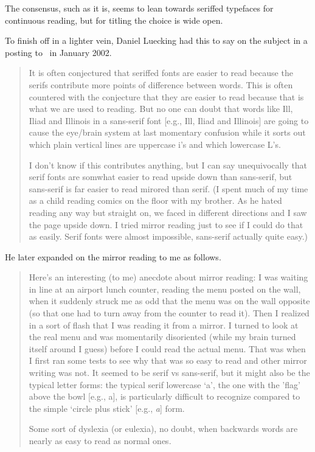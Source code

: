 \documentclass[10pt,letterpaper,extrafontsizes]{memoir}
\begin{document}
    The consensus, such as it is, seems to lean towards seriffed
typefaces for continuous reading, but for titling the choice is
wide open.


    To finish off in a lighter vein,  
    Daniel Luecking had this to say on the subject
in a posting to \pixctt\ in January 2002.
\begin{quotation}
    It is often conjectured that seriffed fonts are easier to read because
the serifs contribute more points of difference between words. This is
often countered with the conjecture that they are easier to read because 
that is what we are used to reading. But no one can doubt that words
like Ill, Iliad and Illinois in a sans-serif font 
[e.g., \textsf{Ill, Iliad and Illinois}] are going to cause the eye/brain 
system at last momentary confusion while it sorts out which plain vertical
lines are uppercase i's and which lowercase L's.

    I don't know if this contributes anything, but I can say unequivocally
that serif fonts are somwhat easier to read upside down than sans-serif,
but sans-serif is far easier to read mirored than serif. (I spent much
of my time as a child reading comics on the floor with my brother. As
he hated reading any way but straight on, we faced in different directions
and I saw the page upside down. I tried mirror reading just to see if
I could do that as easily. Serif fonts were almost impossible, sans-serif
actually quite easy.)

\end{quotation}

    He later expanded on the mirror reading to me as follows.
\begin{quotation}
Here's an interesting (to me) anecdote about mirror reading: I was waiting
in line at an airport lunch counter, reading the menu posted on the wall,
when it suddenly struck me as odd that the menu was on the wall opposite
(so that one had to turn away from the counter to read it). Then I
realized in a sort of flash that I was reading it from a mirror. I turned
to look at the real menu and was momentarily disoriented (while my brain
turned itself around I guess) before I could read the actual menu. That
was when I first ran some tests to see why that was so easy to read and
other mirror writing was not. It seemed to be serif vs sans-serif, but
it might also be the typical letter forms: the typical serif lowercase
`a', the one with the 'flag' above the bowl [e.g., a], is particularly 
difficult to recognize compared to the simple `circle plus stick' 
[e.g., \textit{a}] form.

    Some sort of dyslexia (or eulexia), no doubt, when backwards
words are nearly as easy to read as normal ones.
\end{quotation}
\end{document}
